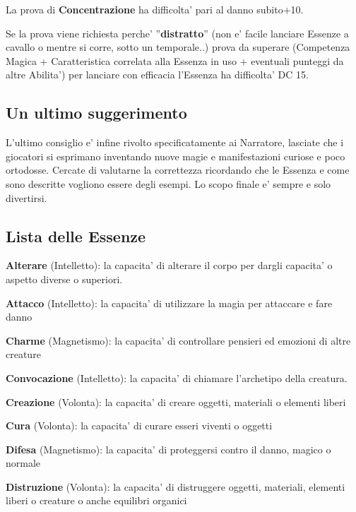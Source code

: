 \documentclass[a4paper,11pt,twoside,openany]{book}
\begin{document}
La prova di \textbf{Concentrazione} ha difficolta' pari al danno subito+10.

Se la prova viene richiesta perche' ''\textbf{distratto}'' (non e' facile lanciare Essenze a cavallo o mentre si corre, sotto un temporale..) prova da superare (Competenza Magica + Caratteristica correlata alla Essenza in uso + eventuali punteggi da altre Abilita') per lanciare con efficacia l'Essenza ha difficolta' DC 15.

\subsection{Un ultimo suggerimento}

L'ultimo consiglio e' infine rivolto specificatamente ai Narratore, lasciate che i giocatori si esprimano inventando nuove magie e manifestazioni curiose e poco ortodosse. Cercate di valutarne la correttezza ricordando che le Essenza e come sono descritte vogliono essere degli esempi. Lo scopo finale e' sempre e solo divertirsi.

\subsection{Lista delle Essenze}

\textbf{Alterare} (Intelletto): la capacita' di alterare il corpo per dargli capacita' o aspetto diverse o superiori.

\textbf{Attacco} (Intelletto): la capacita' di utilizzare la magia per attaccare e fare danno

 \textbf{Charme} (Magnetismo): la capacita' di controllare pensieri
ed emozioni di altre creature

\textbf{Convocazione} (Intelletto): la capacita' di chiamare l'archetipo
della creatura.

\textbf{Creazione} (Volonta): la capacita' di creare oggetti, materiali o elementi liberi

\textbf{Cura} (Volonta): la capacita' di curare esseri viventi o oggetti

\textbf{Difesa} (Magnetismo): la capacita' di proteggersi contro il danno, magico o normale

\textbf{Distruzione} (Volonta): la capacita' di distruggere oggetti, materiali, elementi liberi o creature o anche equilibri organici
\end{document}
